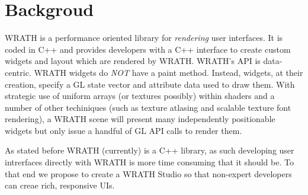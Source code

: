 \documentclass[a4paper,11pt]{article}
\begin{document}
\newpage

\renewcommand{\contentsname}{Table of Contents}
{
\singlespacing
\tableofcontents
}

\setlength{\parindent}{0pt}

\newpage


\section{Backgroud}
\begin{indenter}{2cm}

WRATH is a performance oriented library for \textit{rendering} user interfaces. It is coded in C++ and provides developers with a C++ interface to create custom widgets and layout which are rendered by WRATH. WRATH's API is data-centric. WRATH widgets do \textit{NOT} have a paint method. Instead, widgets, at their creation, specify a GL state vector and attribute data used to draw them. With strategic use of uniform arrays (or textures possibly) within shaders and a number of other techiniques (such as texture atlasing and scalable texture font rendering), a WRATH scene will present many independently positionable widgets but only issue a handful of GL API calls to render them. 

As stated before WRATH (currently) is a C++ library, as such developing user intrerfaces directly with WRATH is more time consuming that it should be. To that end we propose to create a WRATH Studio so that non-expert developers can creae rich, responsive UIs.


\end{indenter}
\end{document}

